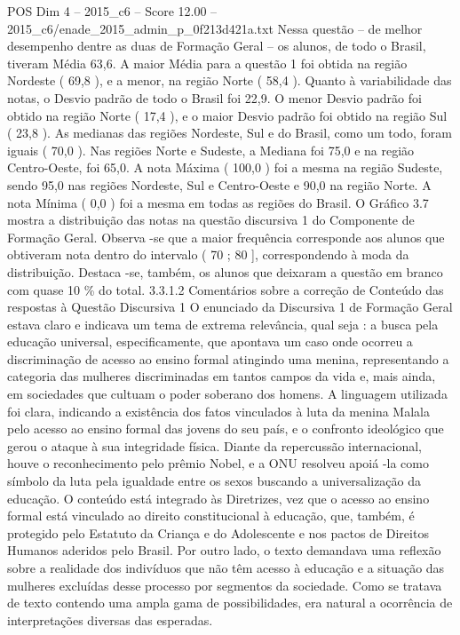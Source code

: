 \begin{textsample}{POS Dim 4 – 2015\_c6 – Score 12.00 – 2015\_c6/enade\_2015\_admin\_p\_0f213d421a.txt}
Nessa questão – de melhor desempenho dentre as duas de Formação Geral – os alunos, de todo o Brasil, tiveram Média 63,6.
A maior Média para a questão 1 foi obtida na região Nordeste ( 69,8 ), e a menor, na região Norte ( 58,4 ).
Quanto à variabilidade das notas, o Desvio padrão de todo o Brasil foi 22,9.
O menor Desvio padrão foi obtido na região Norte ( 17,4 ), e o maior Desvio padrão foi obtido na região Sul ( 23,8 ).
As medianas das regiões Nordeste, Sul e do Brasil, como um todo, foram iguais ( 70,0 ).
Nas regiões Norte e Sudeste, a Mediana foi 75,0 e na região Centro-Oeste, foi 65,0.
A nota Máxima ( 100,0 ) foi a mesma na região Sudeste, sendo 95,0 nas regiões Nordeste, Sul e Centro-Oeste e 90,0 na região Norte.
A nota Mínima ( 0,0 ) foi a mesma em todas as regiões do Brasil.
O Gráfico 3.7 mostra a distribuição das notas na questão discursiva 1 do Componente de Formação Geral.
Observa -se que a maior frequência corresponde aos alunos que obtiveram nota dentro do intervalo ( 70 ; 80 ], correspondendo à moda da distribuição.
Destaca -se, também, os alunos que deixaram a questão em branco com quase 10 \% do total. 3.3.1.2 Comentários sobre a correção de Conteúdo das respostas à Questão Discursiva 1 O enunciado da Discursiva 1 de Formação Geral estava claro e indicava um tema de extrema relevância, qual seja : a busca pela educação universal, especificamente, que apontava um caso onde ocorreu a discriminação de acesso ao ensino formal atingindo uma menina, representando a categoria das mulheres discriminadas em tantos campos da vida e, mais ainda, em sociedades que cultuam o poder soberano dos homens.
A linguagem utilizada foi clara, indicando a existência dos fatos vinculados à luta da menina Malala pelo acesso ao ensino formal das jovens do seu país, e o confronto ideológico que gerou o ataque à sua integridade física.
Diante da repercussão internacional, houve o reconhecimento pelo prêmio Nobel, e a ONU resolveu apoiá -la como símbolo da luta pela igualdade entre os sexos buscando a universalização da educação.
O conteúdo está integrado às Diretrizes, vez que o acesso ao ensino formal está vinculado ao direito constitucional à educação, que, também, é protegido pelo Estatuto da Criança e do Adolescente e nos pactos de Direitos Humanos aderidos pelo Brasil.
Por outro lado, o texto demandava uma reflexão sobre a realidade dos indivíduos que não têm acesso à educação e a situação das mulheres excluídas desse processo por segmentos da sociedade.
Como se tratava de texto contendo uma ampla gama de possibilidades, era natural a ocorrência de interpretações diversas das esperadas.

\end{textsample}
